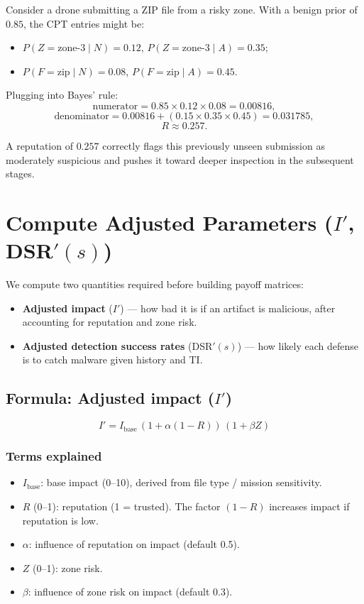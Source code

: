 \documentclass[12pt, a4paper]{report}
\begin{document}
Consider a drone submitting a ZIP file from a risky zone. With a benign
prior of $0.85$, the CPT entries might be:
\begin{itemize}
    \item $P(Z = \text{zone-3} \mid N) = 0.12$, $P(Z = \text{zone-3} \mid A) = 0.35$;
    \item $P(F = \text{zip} \mid N) = 0.08$, $P(F = \text{zip} \mid A) = 0.45$.
\end{itemize}

Plugging into Bayes' rule:
\[
\text{numerator} = 0.85 \times 0.12 \times 0.08 = 0.00816,
\]
\[
\text{denominator} = 0.00816 + (0.15 \times 0.35 \times 0.45) = 0.031785,
\]
\[
R \approx 0.257.
\]

A reputation of $0.257$ correctly flags this previously unseen submission
as moderately suspicious and pushes it toward deeper inspection in the
subsequent stages.


\section{Compute Adjusted Parameters ($I'$, DSR$'(s)$)}

We compute two quantities required before building payoff matrices:

\begin{itemize}
    \item \textbf{Adjusted impact} ($I'$) — how bad it is if an artifact is malicious, after accounting for reputation and zone risk.
    \item \textbf{Adjusted detection success rates} (DSR$'(s)$) — how likely each defense is to catch malware given history and TI.
\end{itemize}

\subsection{Formula: Adjusted impact ($I'$)}

\[
I' = I_{\text{base}} \, (1 + \alpha (1 - R)) \, (1 + \beta Z)
\]

\subsubsection*{Terms explained}

\begin{itemize}
    \item $I_{\text{base}}$: base impact (0--10), derived from file type / mission sensitivity.
    \item $R$ (0--1): reputation (1 = trusted). The factor $(1-R)$ increases impact if reputation is low.
    \item $\alpha$: influence of reputation on impact (default 0.5).
    \item $Z$ (0--1): zone risk.
    \item $\beta$: influence of zone risk on impact (default 0.3).
\end{itemize}
\end{document}
